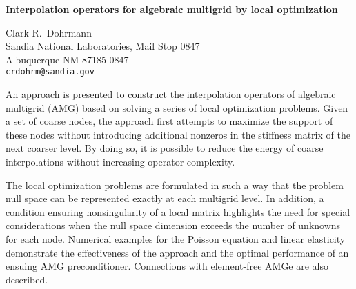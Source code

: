 \documentclass{report}
\begin{document}

\begin{center}
{\large
{\bf Interpolation operators for algebraic multigrid by local optimization}}

	Clark R.~Dohrmann \\
	Sandia National Laboratories, Mail Stop 0847 \\
	Albuquerque NM 87185-0847 \\
	{\tt crdohrm@sandia.gov}
\end{center}
An approach is presented to construct the interpolation
operators of algebraic multigrid (AMG) based on solving a
series of local optimization problems. Given a set of coarse
nodes, the approach first attempts to maximize the support
of these nodes without introducing additional nonzeros in
the stiffness matrix of the next coarser level. By doing so,
it is possible to reduce the energy of coarse interpolations
without increasing operator complexity.

The local
optimization problems are formulated in such a way that the
problem null space can be represented exactly at each
multigrid level. In addition, a condition ensuring
nonsingularity of a local matrix highlights the need for
special considerations when the null space dimension exceeds
the number of unknowns for each node. Numerical examples for
the Poisson equation and linear elasticity demonstrate the
effectiveness of the approach and the optimal performance of
an ensuing AMG preconditioner. Connections with element-free
AMGe are also described.



\end{document}
